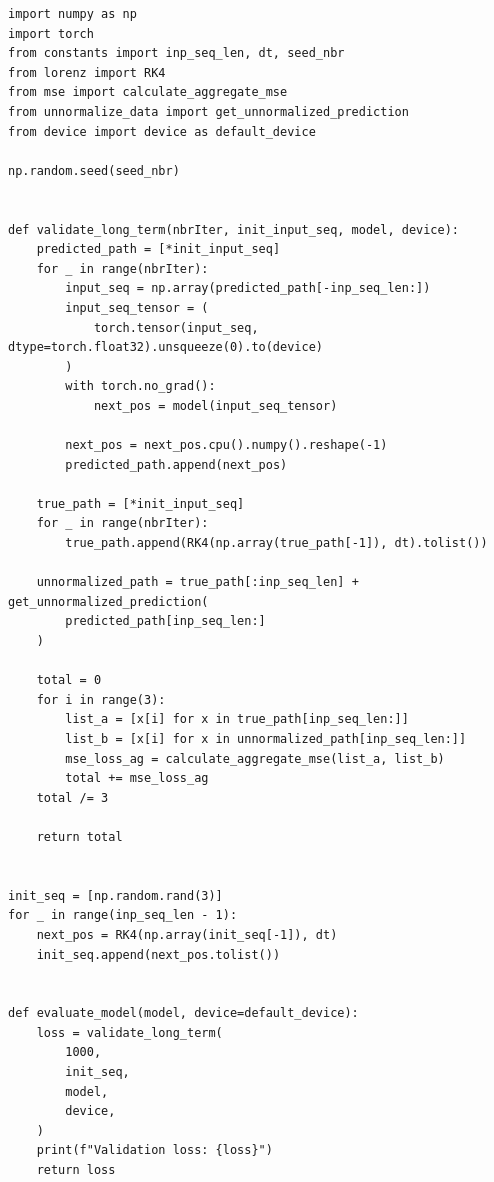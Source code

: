 \documentclass[11pt]{article}
\begin{document}
\begin{lstlisting}[caption={true\_loss.py}, label=true:loss]
import numpy as np
import torch
from constants import inp_seq_len, dt, seed_nbr
from lorenz import RK4
from mse import calculate_aggregate_mse
from unnormalize_data import get_unnormalized_prediction
from device import device as default_device

np.random.seed(seed_nbr)


def validate_long_term(nbrIter, init_input_seq, model, device):
    predicted_path = [*init_input_seq]
    for _ in range(nbrIter):
        input_seq = np.array(predicted_path[-inp_seq_len:])
        input_seq_tensor = (
            torch.tensor(input_seq, dtype=torch.float32).unsqueeze(0).to(device)
        )
        with torch.no_grad():
            next_pos = model(input_seq_tensor)

        next_pos = next_pos.cpu().numpy().reshape(-1)
        predicted_path.append(next_pos)

    true_path = [*init_input_seq]
    for _ in range(nbrIter):
        true_path.append(RK4(np.array(true_path[-1]), dt).tolist())

    unnormalized_path = true_path[:inp_seq_len] + get_unnormalized_prediction(
        predicted_path[inp_seq_len:]
    )

    total = 0
    for i in range(3):
        list_a = [x[i] for x in true_path[inp_seq_len:]]
        list_b = [x[i] for x in unnormalized_path[inp_seq_len:]]
        mse_loss_ag = calculate_aggregate_mse(list_a, list_b)
        total += mse_loss_ag
    total /= 3

    return total


init_seq = [np.random.rand(3)]
for _ in range(inp_seq_len - 1):
    next_pos = RK4(np.array(init_seq[-1]), dt)
    init_seq.append(next_pos.tolist())


def evaluate_model(model, device=default_device):
    loss = validate_long_term(
        1000,
        init_seq,
        model,
        device,
    )
    print(f"Validation loss: {loss}")
    return loss
\end{lstlisting}



\end{document}
